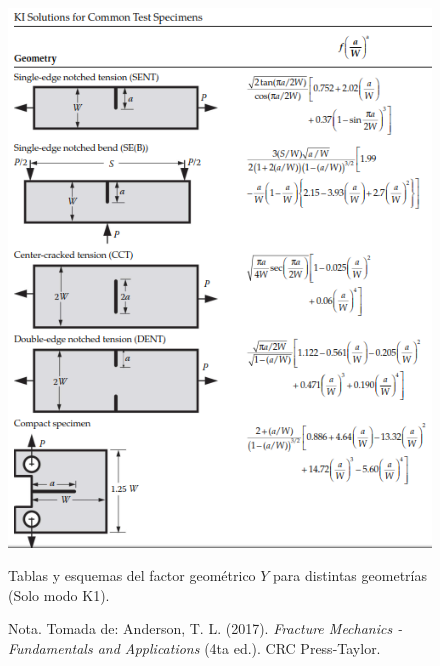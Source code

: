 \documentclass[12pt,letterpaper]{article}
\begin{document}
\begin{figure}[H]
    \centering
    \includegraphics[width=0.85\linewidth]{d.png} %
    \caption{Tablas y esquemas del factor geométrico $Y$ para distintas geometrías (Solo modo K1).}
    \label{fig:factor_intensidad_Y2}
    \caption*{Nota. Tomada de: Anderson, T. L. (2017). \textit{Fracture Mechanics - Fundamentals and Applications} (4ta ed.). CRC Press-Taylor.}\cite{anderson2017fracture}
\end{figure}


\newpage
\printbibliography[title=Referencias]
\end{document}
